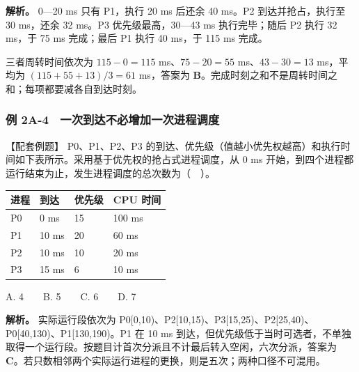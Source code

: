\textbf{解析。} 0---20 ms 只有 P1，执行 20 ms 后还余 40 ms。P2 到达并抢占，执行至 30 ms，还余 32 ms。P3 优先级最高，30---43 ms 执行完毕；随后 P2 执行 32 ms，于 75 ms 完成；最后 P1 执行 40 ms，于 115 ms 完成。

三者周转时间依次为 \(115-0=115\) ms、\(75-20=55\) ms、\(43-30=13\) ms，平均为 \((115+55+13)/3=61\) ms，答案为 \textbf{B}。完成时刻之和不是周转时间之和；每项都要减各自到达时刻。

\subsubsection{例 2A-4　一次到达不必增加一次进程调度}\label{OS02-ex2-4}

\begin{example}[配套例题]

【配套例题】 P0、P1、P2、P3 的到达、优先级（值越小优先权越高）和执行时间如下表所示。采用基于优先权的抢占式进程调度，从 0 ms 开始，到四个进程都运行结束为止，发生进程调度的总次数为（　）。

\begin{wideblock}

\par\medskip\noindent\begin{minipage}{\linewidth}\fontsize{9.3}{12}\selectfont\begin{tabularx}{\linewidth}{@{}YYYY@{}}
\toprule\noalign{}
进程 & 到达 & 优先级 & CPU 时间 \\
\midrule\noalign{}


P0 & 0 ms & 15 & 100 ms \\
P1 & 10 ms & 20 & 60 ms \\
P2 & 10 ms & 10 & 20 ms \\
P3 & 15 ms & 6 & 10 ms \\
\bottomrule\end{tabularx}
\end{minipage}\par\medskip

\end{wideblock}

A. 4　　B. 5　　C. 6　　D. 7

\end{example}

\textbf{解析。} 实际运行段依次为 P0{[}0,10)、P2{[}10,15)、P3{[}15,25)、P2{[}25,40)、P0{[}40,130)、P1{[}130,190)。P1 在 10 ms 到达，但优先级低于当时可选者，不单独取得一个运行段。按题目计首次分派且不计最后转入空闲，六次分派，答案为 \textbf{C}。若只数相邻两个实际运行进程的更换，则是五次；两种口径不可混用。


